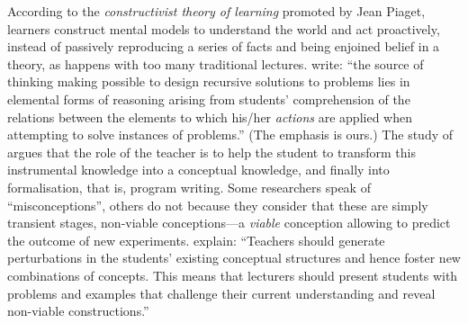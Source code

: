 \documentclass[11pt,a4paper]{article}
\begin{document}
According to the \emph{constructivist theory of learning}
\citep{WuDaleBethel:1998,Ben-Ari:2001} promoted by Jean Piaget,
learners construct mental models to understand the world and act
proactively, instead of passively reproducing a series of facts and
being enjoined belief in a theory, as happens with too many
traditional lectures. \textcite{InhelderPiaget:1963} write: ``the
source of thinking making possible to design recursive solutions to
problems lies in elemental forms of reasoning arising from students'
comprehension of the relations between the elements to which his/her
\emph{actions} are applied when attempting to solve instances of
problems.'' (The emphasis is ours.) The study of
\textcite{daRosa:2005} argues that the role of the teacher is to help
the student to transform this instrumental knowledge into a conceptual
knowledge, and finally into formalisation, that is, program
writing. Some researchers speak of ``misconceptions'', others do not
because they consider that these are simply transient stages,
non-viable conceptions---a \emph{viable} conception allowing to
predict the outcome of new
experiments. \textcite{GotschiSandersGalpin:2003} explain: ``Teachers
should generate perturbations in the students' existing conceptual
structures and hence foster new combinations of concepts. This means
that lecturers should present students with problems and examples that
challenge their current understanding and reveal non-viable
constructions.''
\end{document}

